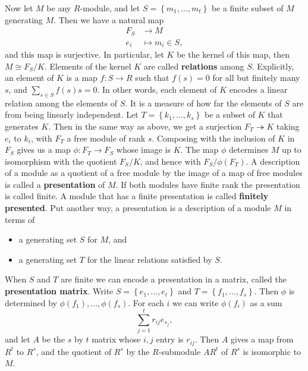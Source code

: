 \documentclass{article}
\newcommand{\rb}[1]{\left( #1 \right)}
\newcommand{\cb}[1]{\left\{ #1 \right\}}
\theoremstyle{definition}\newtheorem{definition}{Definition}[subsection]
\theoremstyle{definition}\newtheorem{remark}[definition]{Remark}
\theoremstyle{definition}\newtheorem*{example}{Example}
\theoremstyle{definition}\newtheorem*{note}{Note}
\begin{document}
Now let $ M $ be any $ R $-module, and let $ S = \cb{m_1, \dots, m_t} $ be a finite subset of $ M $ generating $ M $. Then we have a natural map
\begin{align*}
F_S & \to M \\
e_i & \mapsto m_i \in S,
\end{align*}
and this map is surjective. In particular, let $ K $ be the kernel of this map, then $ M \cong F_S / K $. Elements of the kernel $ K $ are called \textbf{relations} among $ S $. Explicitly, an element of $ K $ is a map $ f : S \to R $ such that $ f\rb{s} = 0 $ for all but finitely many $ s $, and $ \sum_{s \in S} f\rb{s}s = 0 $. In other words, each element of $ K $ encodes a linear relation among the elements of $ S $. It is a measure of how far the elements of $ S $ are from being linearly independent. Let $ T = \cb{k_1, \dots, k_s} $ be a subset of $ K $ that generates $ K $. Then in the same way as above, we get a surjection $ F_T \twoheadrightarrow K $ taking $ e_i $ to $ k_i $, with $ F_T $ a free module of rank $ s $. Composing with the inclusion of $ K $ in $ F_S $ gives us a map $ \phi : F_T \to F_S $ whose image is $ K $. The map $ \phi $ determines $ M $ up to isomorphism with the quotient $ F_S / K $, and hence with $ F_S / \phi\rb{F_T} $. A description of a module as a quotient of a free module by the image of a map of free modules is called a \textbf{presentation} of $ M $. If both modules have finite rank the presentation is called finite. A module that has a finite presentation is called \textbf{finitely presented}. Put another way, a presentation is a description of a module $ M $ in terms of
\begin{itemize}
\item a generating set $ S $ for $ M $, and
\item a generating set $ T $ for the linear relations satisfied by $ S $.
\end{itemize}
When $ S $ and $ T $ are finite we can encode a presentation in a matrix, called the \textbf{presentation matrix}. Write $ S = \cb{e_1, \dots, e_t} $ and $ T = \cb{f_1, \dots, f_s} $. Then $ \phi $ is determined by $ \phi\rb{f_1}, \dots, \phi\rb{f_s} $. For each $ i $ we can write $ \phi\rb{f_i} $ as a sum
$$ \sum_{j = 1}^t r_{ij}e_{s_j}, $$
and let $ A $ be the $ s $ by $ t $ matrix whose $ i, j $ entry is $ r_{ij} $. Then $ A $ gives a map from $ R^t $ to $ R^s $, and the quotient of $ R^s $ by the $ R $-submodule $ AR^t $ of $ R^s $ is isomorphic to $ M $.
\end{document}
